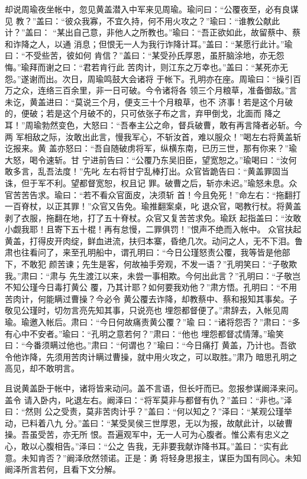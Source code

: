却说周瑜夜坐帐中，忽见黄盖潜入中军来见周瑜。瑜问曰：“公覆夜至，必有良谋见
教？”盖曰：“彼众我寡，不宜久持，何不用火攻之？”瑜曰：“谁教公献此计？”盖曰：
“某出自己意，非他人之所教也。”瑜曰：“吾正欲如此，故留蔡中、蔡和诈降之人，以通
消息；但恨无一人为我行诈降计耳。”盖曰：“某愿行此计。”瑜曰：“不受些苦，彼如何
肯信？”盖曰：“某受孙氏厚恩，虽肝脑涂地，亦无怨悔。”瑜拜而谢之曰：“君若肯行此
苦肉计，则江东之万幸也。”盖曰：“某死亦无怨。”遂谢而出。次日，周瑜鸣鼓大会诸将
于帐下。孔明亦在座。周瑜曰：“操引百万之众，连络三百余里，非一日可破。今令诸将各
领三个月粮草，准备御敌。”言未讫，黄盖进曰：“莫说三个月，便支三十个月粮草，也不
济事！若是这个月破的，便破；若是这个月破不的，只可依张子布之言，弃甲倒戈，北面而
降之耳！”周瑜勃然变色，大怒曰：“吾奉主公之命，督兵破曹，敢有再言降者必斩。今两
军相敌之际，汝敢出此言，慢我军心，不斩汝首，难以服众！”喝左右将黄盖斩讫报来。黄
盖亦怒曰：“吾自随破虏将军，纵横东南，已历三世，那有你来？”瑜大怒，喝令速斩。甘
宁进前告曰：“公覆乃东吴旧臣，望宽恕之。”瑜喝曰：“汝何敢多言，乱吾法度！”先叱
左右将甘宁乱棒打出。众官皆跪告曰：“黄盖罪固当诛，但于军不利。望都督宽恕，权且记
罪。破曹之后，斩亦未迟。”瑜怒未息。众官苦苦告求。瑜曰：“若不看众官面皮，决须斩
首！今且免死！”命左右：“拖翻打一百脊杖，以正其罪！”众官又告免。瑜推翻案桌，叱
退众官，喝教行杖。将黄盖剥了衣服，拖翻在地，打了五十脊杖。众官又复苦苦求免。瑜跃
起指盖曰：“汝敢小觑我耶！且寄下五十棍！再有怠慢，二罪俱罚！”恨声不绝而入帐中。
众官扶起黄盖，打得皮开肉绽，鲜血进流，扶归本寨，昏绝几次。动问之人，无不下泪。鲁
肃也往看问了，来至孔明船中，谓孔明曰：“今日公瑾怒责公覆，我等皆是他部下，不敢犯
颜苦谏；先生是客，何故袖手旁观，不发一语？”孔明笑曰：“子敬欺我。”肃曰：“肃与
先生渡江以来，未尝一事相欺。今何出此言？”孔明曰：“子敬岂不知公瑾今日毒打黄公
覆，乃其计耶？如何要我劝他？”肃方悟。孔明曰：“不用苦肉计，何能瞒过曹操？今必令
黄公覆去诈降，却教蔡中、蔡和报知其事矣。子敬见公瑾时，切勿言亮先知其事，只说亮也
埋怨都督便了。”肃辞去，入帐见周瑜。瑜邀入帐后。肃曰：“今日何故痛责黄公覆？”瑜
曰：“诸将怨否？”肃曰：“多有心中不安者。”瑜曰：“孔明之意若何？”肃曰：“他也
埋怨都督忒情薄。”瑜笑曰：“今番须瞒过他也。”肃曰：“何谓也？”瑜曰：“今日痛打
黄盖，乃计也。吾欲令他诈降，先须用苦肉计瞒过曹操，就中用火攻之，可以取胜。”肃乃
暗思孔明之高见，却不敢明言。

且说黄盖卧于帐中，诸将皆来动问。盖不言语，但长吁而已。忽报参谋阚泽来问。盖令
请入卧内，叱退左右。阚泽曰：“将军莫非与都督有仇？”盖曰：“非也。”泽曰：“然则
公之受责，莫非苦肉计乎？”盖曰：“何以知之？”泽曰：“某观公瑾举动，已料着八九
分。”盖曰：“某受吴侯三世厚恩，无以为报，故献此计，以破曹操。吾虽受苦，亦无所
恨。吾遍观军中，无一人可为心腹者。惟公素有忠义之心，敢以心腹相告。”泽曰：“公之
告我，无非要我献诈降书耳。”盖曰：“实有此意。未知肯否？”阚泽欣然领诺。正是：勇
将轻身思报主，谋臣为国有同心。未知阚泽所言若何，且看下文分解。
